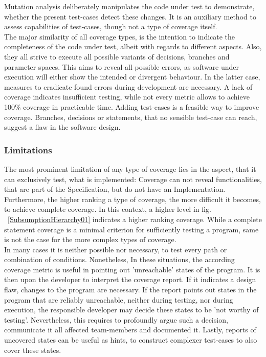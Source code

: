 
	Mutation analysis deliberately manipulates the code under test to demonstrate, whether the present test-cases detect these changes. It is an auxiliary method to assess capabilities of test-cases, though not a type of coverage itself. \\

	The major similarity of all coverage types, is the intention to indicate the completeness of the code under test, albeit with regards to different aspects. Also, they all strive to execute all possible variants of decisions, branches and parameter spaces. This aims to reveal all possible errors, as software under execution will either show the intended or divergent behaviour. In the latter case, measures to eradicate found errors during development are necessary. A lack of coverage indicates insufficient testing, while not every metric allows to achieve 100\% coverage in practicable time. Adding test-cases is a feasible way to improve coverage. Branches, decisions or statements, that no sensible test-case can reach, suggest a flaw in the software design. \\

	\subsubsection{Limitations}
	The most prominent limitation of any type of coverage lies in the aspect, that it can exclusively test, what is implemented: Coverage can not reveal functionalities, that are part of the Specification, but do not have an Implementation. \\	
	Furthermore, the higher ranking a type of coverage, the more difficult it becomes, to achieve complete coverage. In this context, a higher level in fig. ~\ref{SubsumptionHierarchy01}  indicates a higher ranking coverage. While a complete statement coverage is a minimal criterion for sufficiently testing a program, same is not the case for the more complex types of coverage. \\

	In many cases it is neither possible nor necessary, to test every path or combination of conditions. Nonetheless, In these situations, the according coverage metric is useful in pointing out 'unreachable' states of the program. It is then upon the developer to interpret the coverage report. If it indicates a design flaw, changes to the program are necessary. If the report points out states in the program that are reliably unreachable, neither during testing, nor during execution, the responsible developer may decide these states to be 'not worthy of testing'. Nevertheless, this requires to profoundly argue such a decision, communicate it all affected team-members and documented it. Lastly, reports of uncovered states can be useful as hints, to construct complexer test-cases to also cover these states. \\


